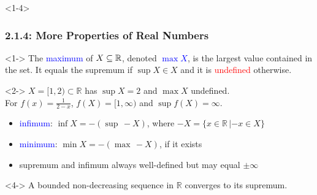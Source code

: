 \documentclass[10pt,english,aspectratio=169]{beamer}
\begin{document}
\begin{frame}<1-4>
\frametitle{2.1.4: More Properties of Real Numbers}

\begin{definition}<1->
The \textcolor{blue}{maximum} of $X\subseteq \mathbb{R}$, denoted \textcolor{blue}{$\max X$}, is the largest value contained in the set.
It equals the supremum if $\sup X \in X$ and it is \textcolor{red}{undefined} otherwise.
\end{definition}

\begin{example}<2->
$X = [1,2) \subset \mathbb{R}$ has $\sup X = 2$ and $\max X$ undefined. \\[1mm]
For $f(x)=\frac{1}{2-x}$, $f(X) = [1,\infty)$ and $\sup f(X) = \infty$.
\end{example}

\begin{itemize}
\item<3-> \textcolor{blue}{infimum}: $\inf X = - \left(\sup \, -\!X\right)$, where $-\!X = \{x\in \mathbb{R}\,|-\!x\in X\}$
\item<3-> \textcolor{blue}{minimum}: $\min X = - \left(\max \, -\!X \right)$, if it exists
\item<3-> supremum and infimum always well-defined but may equal $\pm \infty$
\end{itemize}

\begin{theorem}<4->
A bounded non-decreasing sequence in $\mathbb{R}$ converges to its supremum.
\end{theorem}



\end{frame}  
\end{document}
